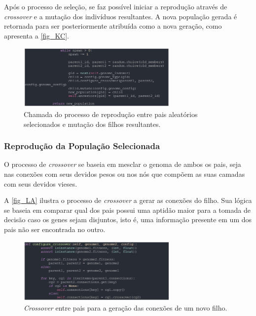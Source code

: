 Após o processo de seleção, se faz possível iniciar a reprodução através de \textit{crossover} e a mutação dos
indivíduos resultantes. A nova população gerada é retornada para ser posteriormente atribuída como a nova geração,
como apresenta a \autoref{fig_KC}.

\begin{figure}[htb]
        \centering
        \caption{\label{fig_KC}Chamada do processo de reprodução entre pais aleatórios selecionados e mutação dos filhos resultantes.}
        \includegraphics[width=0.7\textwidth]{images/KC.png}
\end{figure}

\subsubsection{Reprodução da População Selecionada}

O processo de \textit{crossover} se baseia em mesclar o genoma de ambos os pais,
seja nas conexões com seus devidos pesos ou nos nós que compõem as suas camadas com seus devidos vieses.

A \autoref{fig_LA} ilustra o processo de \textit{crossover} a gerar as conexões do filho.
Sua lógica se baseia em comparar qual dos pais possui uma aptidão maior para a tomada de
decisão caso os genes sejam disjuntos, isto é, uma informação presente em um dos pais não ser encontrada no outro.

\begin{figure}[htb]
        \centering
        \caption{\label{fig_LA}\textit{Crossover} entre pais para a geração das conexões de um novo filho.}
        \includegraphics[width=0.7\textwidth]{images/LA.png}
\end{figure}

